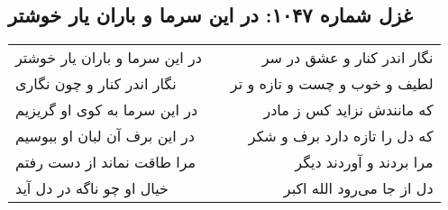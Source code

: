 \begin{center}
\section*{غزل شماره ۱۰۴۷: در این سرما و باران یار خوشتر}
\label{sec:1047}
\begin{longtable}{l p{0.5cm} r}
در این سرما و باران یار خوشتر
&&
نگار اندر کنار و عشق در سر
\\
نگار اندر کنار و چون نگاری
&&
لطیف و خوب و چست و تازه و تر
\\
در این سرما به کوی او گریزیم
&&
که مانندش نزاید کس ز مادر
\\
در این برف آن لبان او ببوسیم
&&
که دل را تازه دارد برف و شکر
\\
مرا طاقت نماند از دست رفتم
&&
مرا بردند و آوردند دیگر
\\
خیال او چو ناگه در دل آید
&&
دل از جا می‌رود الله اکبر
\\
\end{longtable}
\end{center}
